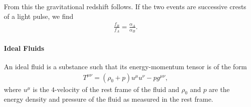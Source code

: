 From this the gravitational redshift follows. If the two events are successive crests of a light pulse, we find
\begin{align*}
	\frac{f_{B}}{f_{A}} = \frac{\alpha_{A}}{\alpha_{B}}.
\end{align*}

\paragraph{Ideal Fluids}
An ideal fluid is a substance such that its energy-momentum tensor is of the form
\begin{align*}
	T^{\mu\nu} = (\rho_{0} + p)u^{\mu}u^{\nu} - pg^{\mu\nu},
\end{align*}
where $u^{\mu}$ is the $4$-velocity of the rest frame of the fluid and $\rho_{0}$ and $p$ are the energy density and pressure of the fluid as measured in the rest frame.